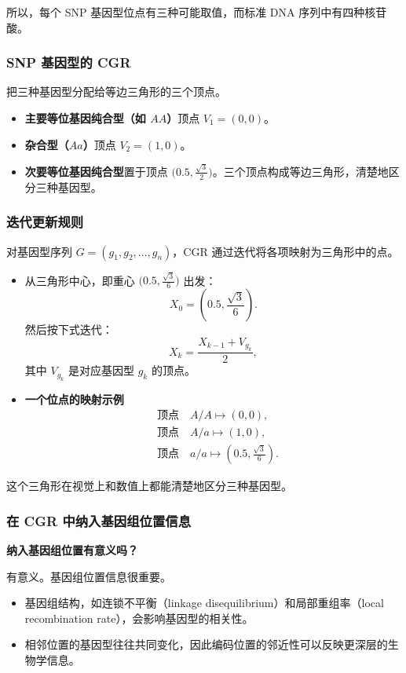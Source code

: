 所以，每个 SNP 基因型位点有三种可能取值，而标准 DNA 序列中有四种核苷酸。

\subsubsection{SNP 基因型的 CGR}
把三种基因型分配给等边三角形的三个顶点。
\begin{itemize}
  \item \textbf{主要等位基因纯合型（如 $AA$）}\quad 顶点 $V_1=(0,0)$。
  \item \textbf{杂合型（$Aa$）}\quad 顶点 $V_2=(1,0)$。
  \item \textbf{次要等位基因纯合型}\quad 置于顶点 $\bigl(0.5,\frac{\sqrt3}{2}\bigr)$。三个顶点构成等边三角形，清楚地区分三种基因型。
\end{itemize}

\subsubsection{迭代更新规则}
对基因型序列 $G=(g_1,g_2,\ldots,g_n)$，CGR 通过迭代将各项映射为三角形中的点。
\begin{itemize}
  \item 从三角形中心，即重心 $\bigl(0.5,\frac{\sqrt3}{6}\bigr)$ 出发：
  \[
    X_0=\left(0.5,\frac{\sqrt3}{6}\right).
  \]
  然后按下式迭代：
  \[
    X_k=\frac{X_{k-1}+V_{g_k}}{2},
  \]
  其中 $V_{g_k}$ 是对应基因型 $g_k$ 的顶点。
  \item \textbf{一个位点的映射示例}
  \[
    \begin{aligned}
      &\text{顶点}\quad A/A\longmapsto(0,0),\\
      &\text{顶点}\quad A/a\longmapsto(1,0),\\
      &\text{顶点}\quad a/a\longmapsto\left(0.5,\frac{\sqrt3}{6}\right).
    \end{aligned}
  \]
\end{itemize}
这个三角形在视觉上和数值上都能清楚地区分三种基因型。

\subsubsection{在 CGR 中纳入基因组位置信息}
\textbf{纳入基因组位置有意义吗？}

有意义。基因组位置信息很重要。
\begin{itemize}
  \item 基因组结构，如连锁不平衡（linkage disequilibrium）和局部重组率（local recombination rate），会影响基因型的相关性。
  \item 相邻位置的基因型往往共同变化，因此编码位置的邻近性可以反映更深层的生物学信息。
\end{itemize}

